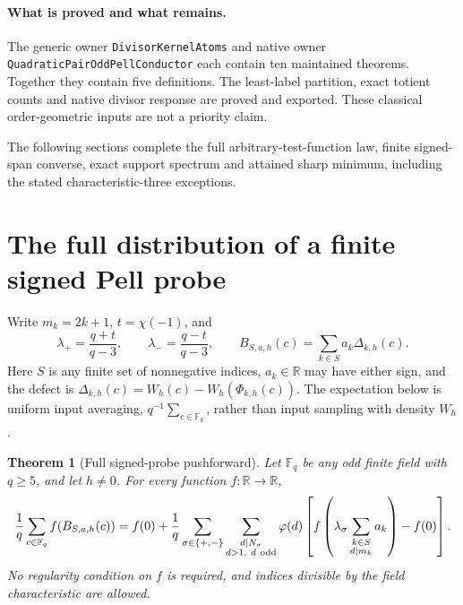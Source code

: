 \documentclass[11pt]{article}
\newtheorem{theorem}{Theorem}[section]
\begin{document}
\paragraph{What is proved and what remains.}
The generic owner \texttt{DivisorKernelAtoms} and native owner
\texttt{QuadraticPairOddPellConductor} each contain ten maintained
theorems. Together they contain five definitions.
The least-label partition, exact totient counts and native
divisor response are proved and exported.
These classical order-geometric inputs are not a priority claim.

The following sections complete the full arbitrary-test-function law,
finite signed-span converse, exact support spectrum and attained sharp
minimum, including the stated characteristic-three exceptions.

\section{The full distribution of a finite signed Pell probe}
\label{sec:odd-pell-full-distribution}

Write \(m_k=2k+1\), \(t=\chi(-1)\), and
\[
 \lambda_+=\frac{q+t}{q-3},\qquad
 \lambda_-=\frac{q-t}{q-3},\qquad
 B_{S,a,h}(c)=\sum_{k\in S}a_k\Delta_{k,h}(c).
\]
Here \(S\) is any finite set of nonnegative indices,
\(a_k\in\mathbb R\) may have either sign, and the defect is
\(\Delta_{k,h}(c)=W_h(c)-W_h(\Phi_{k,h}(c))\).
The expectation below is uniform input averaging,
\(q^{-1}\sum_{c\in\mathbb F_q}\), rather than input sampling
with density \(W_h\).

\begin{theorem}[Full signed-probe pushforward]
\label{thm:odd-pell-full-distribution}
Let \(\mathbb F_q\) be any odd finite field with \(q\ge5\),
and let \(h\ne0\). For every function \(f:\mathbb R\to\mathbb R\),
\begin{align*}
 \frac1q\sum_{c\in\mathbb F_q}f(B_{S,a,h}(c))
  =f(0)+\frac1q\sum_{\sigma\in\{+,-\}}
     \sum_{\substack{d\mid N_\sigma\\d>1,\ d\ {\rm odd}}}
       \varphi(d)
       \left[
       f\left(\lambda_\sigma
           \sum_{\substack{k\in S\\d\mid m_k}}a_k\right)-f(0)
       \right].
\end{align*}
No regularity condition on \(f\) is required, and indices divisible
by the field characteristic are allowed.
\end{theorem}
\end{document}
